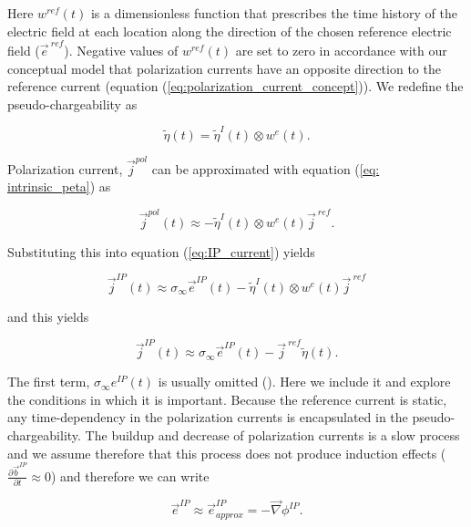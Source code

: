 \documentclass[extra,mreferee]{gji}
\newcommand{\grad}{\vec \nabla}
\newcommand{\siginf}{\sigma_\infty}
\renewcommand {\j}  { {\vec j} }
\renewcommand {\b}  { {\vec b} }
\newcommand {\e}  { {\vec e} }
\newcommand{\peta}{\tilde{\eta}}
\newcommand{\eref}{\e^{\ ref}}
\newcommand{\jref}{\j^{\ ref}}
\begin{document}
Here $w^{ref}(t)$ is a dimensionless function that prescribes the time history of the electric field at each location along the direction of the chosen reference electric field ($\eref$).  Negative values of  $w^{ref}(t)$ are set to zero in accordance with our conceptual model that polarization currents have an opposite direction to the reference current (equation (\ref{eq:polarization_current_concept})).
We redefine the pseudo-chargeability as
\begin{linenomath*}
\begin{equation}
    \peta(t) = \peta^{I}(t)\otimes w^e(t).
    \label{eq: pseudochargeability}
\end{equation}
\end{linenomath*}
Polarization current, $\j^{pol}$ can be approximated with equation (\ref{eq: intrinsic_peta}) as
\begin{linenomath*}
\begin{equation}
  \j^{pol}(t) \approx - \peta^{I}(t)\otimes w^e(t)\jref.
\end{equation}
\end{linenomath*}
Substituting this into equation (\ref{eq:IP_current}) yields
\begin{linenomath*}
\begin{equation}
  \j^{IP}(t) \approx \siginf\e^{IP}(t) - \peta^{I}(t)\otimes w^e(t)\jref
\end{equation}
\end{linenomath*}
and this yields
\begin{linenomath*}
\begin{equation}
  \j^{IP}(t) \approx \siginf\e^{IP}(t) -\jref\peta(t).
  \label{eq: jip_EMIP}
\end{equation}
\end{linenomath*}

The first term, $\siginf e^{IP}(t)$ is usually omitted (\cite{Smith1988a}). Here we include it and explore the conditions in which it is important. 
Because the reference current is static, any time-dependency in the polarization currents is encapsulated in the pseudo-chargeability. The buildup and decrease of polarization currents is a slow process and we assume therefore that this process does not produce induction effects ($\frac{\partial \b^{IP}}{\partial t} \approx 0$) and therefore we can write 
\begin{linenomath*}
\begin{equation}
  \e^{IP} \approx  \e^{IP}_{approx} = -\grad\phi^{IP}.
  \label{eq: eip_approx}
\end{equation}
\end{linenomath*}
\end{document}
